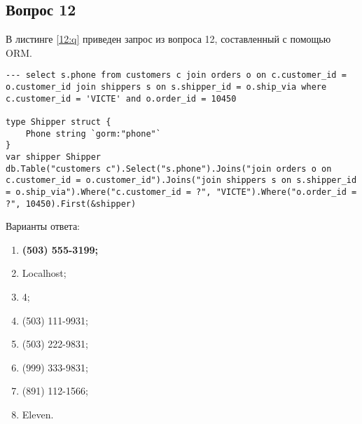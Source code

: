 \begin{appendices}
%
%
%
%
%

\section{Вопрос 12}

В листинге \ref{12:q} приведен запрос из вопроса 12, составленный с помощью ORM.

\begin{lstlisting}[label=12:q,caption=Вопрос 12]
--- select s.phone from customers c join orders o on c.customer_id = o.customer_id join shippers s on s.shipper_id = o.ship_via where c.customer_id = 'VICTE' and o.order_id = 10450

type Shipper struct {
	Phone string `gorm:"phone"`
}
var shipper Shipper
db.Table("customers c").Select("s.phone").Joins("join orders o on c.customer_id = o.customer_id").Joins("join shippers s on s.shipper_id = o.ship_via").Where("c.customer_id = ?", "VICTE").Where("o.order_id = ?", 10450).First(&shipper)
\end{lstlisting}

Варианты ответа:

\begin{enumerate}
	\item \textbf{(503) 555-3199;}
	\item Localhost;
	\item 4;
	\item (503) 111-9931;
	\item (503) 222-9831;
	\item (999) 333-9831;
	\item (891) 112-1566;
	\item Eleven.
\end{enumerate}


\end{appendices}
